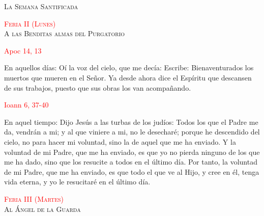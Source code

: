 \documentclass[10pt]{article}
\begin{document}
\begin{center}
      \textsc{\Large La Semana Santificada}
\end{center}

\begin{multicols}{2}

      \begin{center}
            \textsc{\textcolor{red}{Feria II (Lunes)}\\ {\large A las Benditas almas del Purgatorio}}
      \end{center}

      \hfill\textcolor{red}{Apoc 14, 13}

      En aquellos días: Oí la voz del cielo, que me decía: Escribe: Bienaventurados los muertos que mueren en el Señor. Ya desde ahora dice el Espíritu que descansen
      de sus trabajos, puesto que sus obras los van acompañando.\newline
      
      \hfill\textcolor{red}{Ioann 6, 37-40}

      En aquel tiempo: Dijo Jesús a las turbas de los judíos: Todos los que el Padre me da, vendrán a mi; y al que viniere a mi, no le desecharé; porque he descendido
      del cielo, no para hacer mi voluntad, sino la de aquel que me ha enviado. Y la voluntad de mi Padre, que me ha enviado, es que yo no pierda ninguno de los que
      me ha dado, sino que los resucite a todos en el último día. Por tanto, la voluntad de mi Padre, que me ha enviado, es que todo el que ve al Hijo, y cree en él,
      tenga vida eterna, y yo le resucitaré en el último día.\newline
      
      \begin{otherlanguage}{latin}
            

            

            

            

            
      \end{otherlanguage}

      \begin{center}
            \textsc{\textcolor{red}{Feria III (Martes)}\\ {\large Al Ángel de la Guarda}}
      \end{center}


\end{multicols}
\end{document}
